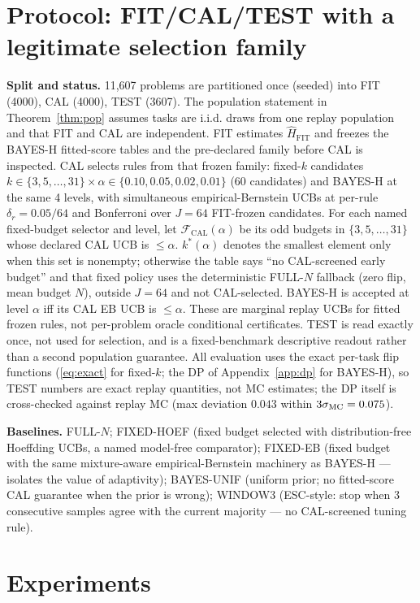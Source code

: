 \documentclass{article}
\theoremstyle{definition}
\theoremstyle{remark}
\begin{document}
\section{Protocol: FIT/CAL/TEST with a legitimate selection family}
\label{sec:protocol}

\textbf{Split and status.} 11{,}607 problems are partitioned once (seeded)
into FIT (4000), CAL (4000), TEST (3607). The population statement in
Theorem~\ref{thm:pop} assumes tasks are i.i.d. draws from one replay
population and that FIT and CAL are independent. FIT estimates
$\widehat H_{\mathrm{FIT}}$ and freezes the BAYES-H fitted-score tables and
the pre-declared family before CAL is inspected. CAL selects rules from that
frozen family:
fixed-$k$ candidates $k\in\{3,5,\dots,31\}\times\alpha\in\{0.10,0.05,0.02,
0.01\}$ (60 candidates) and BAYES-H at the same 4 levels, with simultaneous
empirical-Bernstein UCBs at per-rule $\delta_r=0.05/64$ and Bonferroni over
$J=64$ FIT-frozen candidates. For each named fixed-budget selector and level,
let $\mathcal F_{\mathrm{CAL}}(\alpha)$ be its odd budgets in
$\{3,5,\dots,31\}$ whose declared CAL UCB is $\le\alpha$.
$k^*(\alpha)$ denotes the smallest element only when this set is nonempty;
otherwise the table says ``no CAL-screened early budget'' and that fixed policy
uses the deterministic FULL-$N$ fallback (zero flip, mean budget $N$), outside
$J=64$ and not CAL-selected. BAYES-H is accepted at level $\alpha$ iff its CAL
EB UCB is $\le\alpha$. These are marginal replay UCBs for fitted frozen rules,
not per-problem oracle conditional certificates. TEST is read exactly once, not used
for selection, and is a fixed-benchmark descriptive readout rather than a
second population guarantee. All evaluation uses the exact per-task flip
functions (\eqref{eq:exact} for
fixed-$k$; the DP of Appendix~\ref{app:dp} for BAYES-H), so TEST numbers are
exact replay quantities, not MC estimates; the DP itself is cross-checked
against replay MC (max deviation $0.043$ within $3\sigma_{\rm MC}=0.075$).

\textbf{Baselines.} FULL-$N$; FIXED-HOEF (fixed budget selected with
distribution-free Hoeffding UCBs, a named model-free comparator);
FIXED-EB (fixed budget with the same mixture-aware empirical-Bernstein
machinery as BAYES-H --- isolates the value of adaptivity);
BAYES-UNIF (uniform prior; no fitted-score CAL guarantee when the prior is wrong);
WINDOW3 (ESC-style: stop when 3 consecutive samples agree with the current
majority --- no CAL-screened tuning rule).

\section{Experiments}
\label{sec:experiments}
\end{document}
